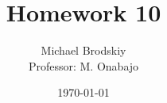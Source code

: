 


\title{Homework 10}
\date{\today}
\author{Michael Brodskiy\\ \small Professor: M. Onabajo}



\maketitle

